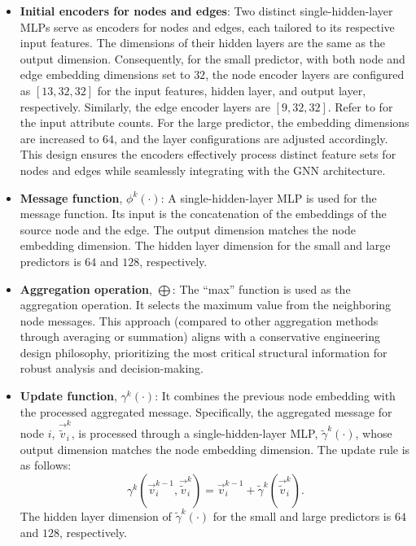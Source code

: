 \begin{itemize}
    \item {\bf{Initial encoders for nodes and edges}}: Two distinct single-hidden-layer MLPs serve as encoders for nodes and edges, each tailored to its respective input features. The dimensions of their hidden layers are the same as the output dimension. Consequently, for the small predictor, with both node and edge embedding dimensions set to $32$, the node encoder layers are configured as $[13, 32, 32]$ for the input features, hidden layer, and output layer, respectively. Similarly, the edge encoder layers are $[9, 32, 32]$. Refer to  for the input attribute counts. For the large predictor, the embedding dimensions are increased to $64$, and the layer configurations are adjusted accordingly. This design ensures the encoders effectively process distinct feature sets for nodes and edges while seamlessly integrating with the GNN architecture.
    \item {\bf{Message function}}, $\phi^k(\cdot)$: A single-hidden-layer MLP is used for the message function. Its input is the concatenation of the embeddings of the source node and the edge. The output dimension matches the node embedding dimension. The hidden layer dimension for the small and large predictors is $64$ and $128$, respectively.
    \item {\bf{Aggregation operation}}, $\bigoplus$: The ``max'' function is used as the aggregation operation. It selects the maximum value from the neighboring node messages. This approach (compared to other aggregation methods through averaging or summation) aligns with a conservative engineering design philosophy, prioritizing the most critical structural information for robust analysis and decision-making.
    \item {\bf{Update function}}, $\gamma^k(\cdot)$: It combines the previous node embedding with the processed aggregated message. Specifically, the aggregated message for node $i$, $\vec{\tilde{v}}_{i}^k$, is processed through a single-hidden-layer MLP, $\tilde{\gamma}^k(\cdot)$, whose output dimension matches the node embedding dimension. The update rule is as follows: 
    \begin{equation}
        \gamma^k\left(\vec{v}_{i}^{k-1}, \vec{\tilde{v}}_{i}^k\right) = \vec{v}_{i}^{k-1} + \tilde{\gamma}^k\left(\vec{\tilde{v}}_{i}^k\right).
    \end{equation}
    The hidden layer dimension of $\tilde{\gamma}^k(\cdot)$ for the small and large predictors is $64$ and $128$, respectively.

\end{itemize}
